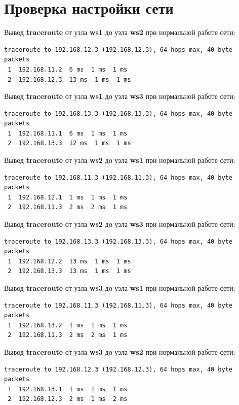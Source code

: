 \documentclass[a4paper,12pt]{article}
\begin{document}
\section{Проверка настройки сети}

Вывод \textbf{traceroute} от узла \textbf{ws1} до узла \textbf{ws2} при нормальной работе сети:

\begin{Verbatim}
traceroute to 192.168.12.3 (192.168.12.3), 64 hops max, 40 byte packets
 1  192.168.11.2  6 ms  1 ms  1 ms
 2  192.168.12.3  13 ms  1 ms  1 ms
\end{Verbatim}

Вывод \textbf{traceroute} от узла \textbf{ws1} до узла \textbf{ws3} при нормальной работе сети:

\begin{Verbatim}
traceroute to 192.168.13.3 (192.168.13.3), 64 hops max, 40 byte packets
 1  192.168.11.1  6 ms  1 ms  1 ms
 2  192.168.13.3  12 ms  1 ms  1 ms
\end{Verbatim}

Вывод \textbf{traceroute} от узла \textbf{ws2} до узла \textbf{ws1} при нормальной работе сети:

\begin{Verbatim}
traceroute to 192.168.11.3 (192.168.11.3), 64 hops max, 40 byte packets
 1  192.168.12.1  1 ms  1 ms  1 ms
 2  192.168.11.3  2 ms  2 ms  1 ms
\end{Verbatim}

Вывод \textbf{traceroute} от узла \textbf{ws2} до узла \textbf{ws3} при нормальной работе сети:

\begin{Verbatim}
traceroute to 192.168.13.3 (192.168.13.3), 64 hops max, 40 byte packets
 1  192.168.12.2  13 ms  1 ms  1 ms
 2  192.168.13.3  13 ms  1 ms  1 ms
\end{Verbatim}

Вывод \textbf{traceroute} от узла \textbf{ws3} до узла \textbf{ws1} при нормальной работе сети:

\begin{Verbatim}
traceroute to 192.168.11.3 (192.168.11.3), 64 hops max, 40 byte packets
 1  192.168.13.2  1 ms  1 ms  1 ms
 2  192.168.11.3  2 ms  2 ms  1 ms
\end{Verbatim}

Вывод \textbf{traceroute} от узла \textbf{ws3} до узла \textbf{ws2} при нормальной работе сети:

\begin{Verbatim}
traceroute to 192.168.12.3 (192.168.12.3), 64 hops max, 40 byte packets
 1  192.168.13.1  1 ms  1 ms  1 ms
 2  192.168.12.3  2 ms  1 ms  2 ms
\end{Verbatim}
\end{document}
